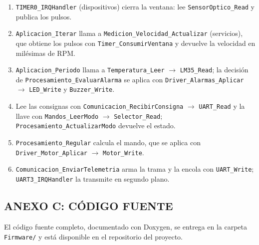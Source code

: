 \begin{enumerate}
  \item \texttt{TIMER0\_IRQHandler} (dispositivos) cierra la ventana: lee
  \texttt{SensorOptico\_Read} y publica los pulsos.
  \item \texttt{Aplicacion\_Iterar} llama a \texttt{Medicion\_Velocidad\_Actualizar}
  (servicios), que obtiene los pulsos con \texttt{Timer\_ConsumirVentana} y devuelve la
  velocidad en milésimas de RPM.
  \item \texttt{Aplicacion\_Periodo} llama a \texttt{Temperatura\_Leer} $\rightarrow$
  \texttt{LM35\_Read}; la decisión de \texttt{Procesamiento\_EvaluarAlarma} se aplica con
  \texttt{Driver\_Alarmas\_Aplicar} $\rightarrow$ \texttt{LED\_Write} y
  \texttt{Buzzer\_Write}.
  \item Lee las consignas con \texttt{Comunicacion\_RecibirConsigna} $\rightarrow$
  \texttt{UART\_Read} y la llave con \texttt{Mandos\_LeerModo} $\rightarrow$
  \texttt{Selector\_Read}; \texttt{Procesamiento\_ActualizarModo} devuelve el estado.
  \item \texttt{Procesamiento\_Regular} calcula el mando, que se aplica con
  \texttt{Driver\_Motor\_Aplicar} $\rightarrow$ \texttt{Motor\_Write}.
  \item \texttt{Comunicacion\_EnviarTelemetria} arma la trama y la encola con
  \texttt{UART\_Write}; \texttt{UART3\_IRQHandler} la transmite en segundo plano.
\end{enumerate}

\subsection{ANEXO C: CÓDIGO FUENTE}

El código fuente completo, documentado con Doxygen, se entrega en la carpeta
\texttt{Firmware/} y está disponible en el repositorio del proyecto.
